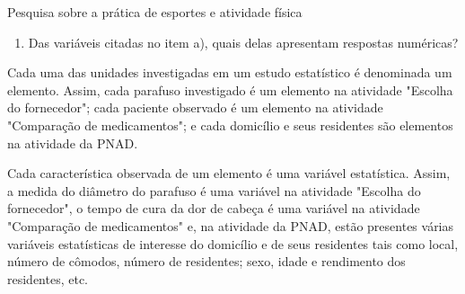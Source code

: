\begin{task}{ Pesquisa sobre a prática de esportes e atividade física}
\begin{enumerate}
\item {} 
Das variáveis citadas no item a), quais delas apresentam respostas numéricas?

\end{enumerate}

Cada uma das unidades investigadas em um estudo estatístico é denominada um elemento.  Assim, cada parafuso investigado é um elemento na atividade "Escolha do fornecedor"; cada paciente observado é um elemento na atividade "Comparação de medicamentos"; e cada domicílio e seus residentes são elementos na atividade da PNAD.

Cada característica observada de um elemento é uma variável estatística. Assim, a medida do diâmetro do parafuso é uma variável na atividade "Escolha do fornecedor", o tempo de cura da dor de cabeça é uma variável na atividade "Comparação de medicamentos" e, na atividade da PNAD, estão presentes várias variáveis estatísticas de interesse do domicílio e de seus residentes tais como local, número de cômodos, número de residentes; sexo, idade e rendimento dos residentes, etc.
\end{task}

